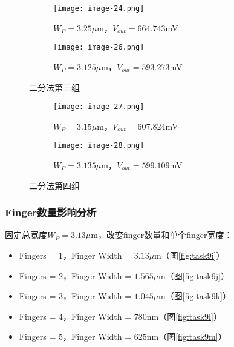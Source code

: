 \documentclass[UTF8,12pt,a4paper]{ctexart}
\begin{document}
\begin{figure}[htbp]
    \centering
    \begin{subfigure}[b]{0.45\textwidth} %
        \centering
        \texttt{[image: image-24.png]} 
        \caption{$W_P = 3.25\mu$m，$V_{out} = 664.743$mV}
        \label{fig:task9e}
    \end{subfigure}
    \hfill %
    \begin{subfigure}[b]{0.45\textwidth}
        \centering
        \texttt{[image: image-26.png]} 
        \caption{$W_P = 3.125\mu$m，$V_{out} = 593.273$mV}
        \label{fig:task9f}
    \end{subfigure}
    \label{fig:task9ef}
    \caption{二分法第三组}
\end{figure}

\begin{figure}[htbp]
    \centering
    \begin{subfigure}[b]{0.45\textwidth} %
        \centering
        \texttt{[image: image-27.png]} 
        \caption{$W_P = 3.15\mu$m，$V_{out} = 607.824$mV}
        \label{fig:task9g}
    \end{subfigure}
    \hfill %
    \begin{subfigure}[b]{0.45\textwidth}
        \centering
        \texttt{[image: image-28.png]} 
        \caption{$W_P = 3.135\mu$m，$V_{out} = 599.109$mV}
        \label{fig:task9h}
    \end{subfigure}
    \label{fig:task9gh}
    \caption{二分法第四组}
\end{figure}


\subsubsection{Finger数量影响分析}
固定总宽度$W_P = 3.13\mu$m，改变finger数量和单个finger宽度：

\begin{itemize}
\item Fingers = 1，Finger Width = $3.13\mu$m（图\ref{fig:task9i}）
\item Fingers = 2，Finger Width = $1.565\mu$m（图\ref{fig:task9j}）
\item Fingers = 3，Finger Width = $1.045\mu$m（图\ref{fig:task9k}）
\item Fingers = 4，Finger Width = $780$nm（图\ref{fig:task9l}）
\item Fingers = 5，Finger Width = $625$nm（图\ref{fig:task9m}）
\end{itemize}
\end{document}
